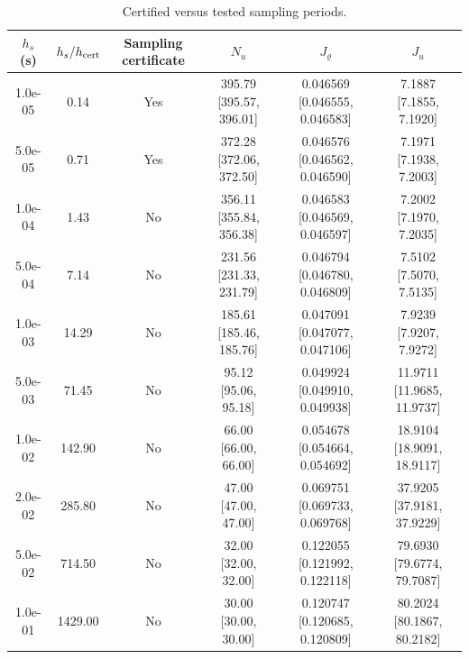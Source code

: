 \begin{table}[t]
\centering
\scriptsize
\caption{Certified versus tested sampling periods.}
\label{tab:r4_sampling}
\renewcommand{\arraystretch}{1.12}
\begin{tabular}{cccccc}
\toprule
$h_s$ (s) & $h_s/h_{\rm cert}$ & Sampling certificate & $N_u$ & $J_\varrho$ & $J_u$ \\
\midrule
1.0e-05 & 0.14 & Yes & 395.79 [395.57, 396.01] & 0.046569 [0.046555, 0.046583] & 7.1887 [7.1855, 7.1920] \\
5.0e-05 & 0.71 & Yes & 372.28 [372.06, 372.50] & 0.046576 [0.046562, 0.046590] & 7.1971 [7.1938, 7.2003] \\
1.0e-04 & 1.43 & No & 356.11 [355.84, 356.38] & 0.046583 [0.046569, 0.046597] & 7.2002 [7.1970, 7.2035] \\
5.0e-04 & 7.14 & No & 231.56 [231.33, 231.79] & 0.046794 [0.046780, 0.046809] & 7.5102 [7.5070, 7.5135] \\
1.0e-03 & 14.29 & No & 185.61 [185.46, 185.76] & 0.047091 [0.047077, 0.047106] & 7.9239 [7.9207, 7.9272] \\
5.0e-03 & 71.45 & No & 95.12 [95.06, 95.18] & 0.049924 [0.049910, 0.049938] & 11.9711 [11.9685, 11.9737] \\
1.0e-02 & 142.90 & No & 66.00 [66.00, 66.00] & 0.054678 [0.054664, 0.054692] & 18.9104 [18.9091, 18.9117] \\
2.0e-02 & 285.80 & No & 47.00 [47.00, 47.00] & 0.069751 [0.069733, 0.069768] & 37.9205 [37.9181, 37.9229] \\
5.0e-02 & 714.50 & No & 32.00 [32.00, 32.00] & 0.122055 [0.121992, 0.122118] & 79.6930 [79.6774, 79.7087] \\
1.0e-01 & 1429.00 & No & 30.00 [30.00, 30.00] & 0.120747 [0.120685, 0.120809] & 80.2024 [80.1867, 80.2182] \\
\bottomrule
\end{tabular}
\end{table}
